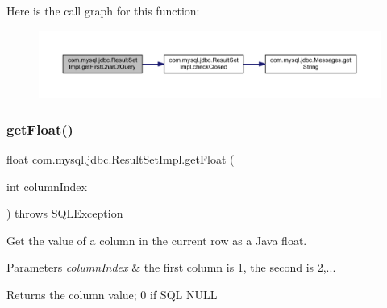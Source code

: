 Here is the call graph for this function\+:
\nopagebreak
\begin{figure}[H]
\begin{center}
\leavevmode
\includegraphics[width=350pt]{classcom_1_1mysql_1_1jdbc_1_1_result_set_impl_a89ddba59e7cbed718934f80f443f69f8_cgraph}
\end{center}
\end{figure}
\mbox{\label{classcom_1_1mysql_1_1jdbc_1_1_result_set_impl_a1a4fb5819b39bf4594b05bdec4527df3}} 
\subsubsection{\texorpdfstring{get\+Float()}{getFloat()}\hspace{0.1cm}{\footnotesize\ttfamily [1/2]}}
{\footnotesize\ttfamily float com.\+mysql.\+jdbc.\+Result\+Set\+Impl.\+get\+Float (\begin{DoxyParamCaption}\item[{int}]{column\+Index }\end{DoxyParamCaption}) throws S\+Q\+L\+Exception}

Get the value of a column in the current row as a Java float.


\begin{DoxyParams}{Parameters}
{\em column\+Index} & the first column is 1, the second is 2,...\\
\hline
\end{DoxyParams}
\begin{DoxyReturn}{Returns}
the column value; 0 if S\+QL N\+U\+LL
\end{DoxyReturn}

